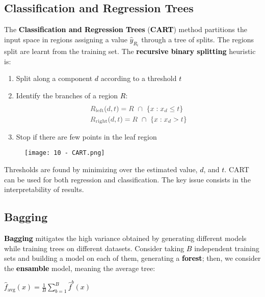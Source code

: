 \documentclass{article}
\newcommand{\bb}[1]{\textcolor{black}{\textbf{#1}}}
\newcommand{\rr}[1]{\textcolor{black}{#1}}
\newcommand{\cc}[1]{\begin{center}\textcolor{black}{#1}\end{center}}
\begin{document}
\subsection{Classification and Regression Trees}
The \bb{Classification and Regression Trees} (\bb{CART}) method partitions the input space in regions assigning a value \rr{$\hat{y}_{R_i}$} through a tree of splits. The regions split are learnt from the training set. The \bb{recursive binary splitting} heuristic is:
\begin{enumerate}
    \item Split along a component \rr{$d$} according to a threshold \rr{$t$}
    \item Identify the branches of a region \rr{$R$}:
        \begin{align*}
            &\textcolor{darkgray}{R_{\text{left}}(d,t) = R \ \cap \ \{x:x_d\leq t\}} \\
            &\textcolor{darkgray}{R_{\text{right}}(d,t) = R \ \cap \ \{x:x_d > t\}}
        \end{align*}
    \item Stop if there are few points in the leaf region
\end{enumerate}
\begin{figure}[H]
    \centering
    \texttt{[image: 10 - CART.png]}
\end{figure}
Thresholds are found by minimizing over the estimated value, \rr{$d$}, and \rr{$t$}. CART can be used for both regression and classification. The key issue consists in the interpretability of results.

\subsection{Bagging}
\bb{Bagging} mitigates the high variance obtained by generating different models while training trees on different datasets. Consider taking \rr{$B$} independent training sets and building a model on each of them, generating a \bb{forest}; then, we consider the \bb{ensamble} model, meaning the average tree:
\cc{$\hat{f}_{\text{avg}}(x)= \displaystyle\frac{1}{B}\displaystyle\sum^B_{b=1}\hat{f}^b(x)$}

\end{document}

